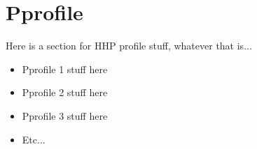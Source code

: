 \chapter{Pprofile}
Here is a section for HHP profile stuff, whatever that is...

\begin{itemize}
\item Pprofile 1 stuff here
\item Pprofile 2 stuff here
\item Pprofile 3 stuff here
\item Etc...
\end{itemize}


